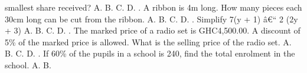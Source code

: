 \documentclass{article}
\begin{document}
\begin{multicols}{2}
smallest share received? \newline \indent A. \newline \indent B. \newline \indent C. \newline \indent D.  \newline{}. A ribbon is 4m long. How many pieces each 30cm long can be cut from the ribbon. \newline \indent A. \newline \indent B. \newline \indent C. \newline \indent D.  \newline{}. Simplify 7(y + 1) â€“ 2 (2y + 3) \newline \indent A. \newline \indent B. \newline \indent C. \newline \indent D.  \newline{}. The marked price of a radio set is GHC4,500.00. A discount of 5\% of the marked price is allowed. What is the selling price of the radio set. \newline \indent A. \newline \indent B. \newline \indent C. \newline \indent D.  \newline{}. If 60\% of the pupils in a school is 240, find the total enrolment in the school. \newline \indent A. \newline \indent B. \newl
\end{multicols}
\end{document}

